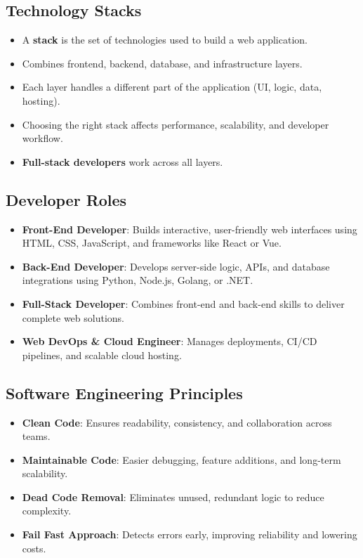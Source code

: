 \documentclass[hidelinks]{article}
\begin{document}
\subsection{Technology Stacks}
\begin{itemize}
  \item A \textbf{stack} is the set of technologies used to build a web application.
  \item Combines frontend, backend, database, and infrastructure layers.
  \item Each layer handles a different part of the application (UI, logic, data, hosting).
  \item Choosing the right stack affects performance, scalability, and developer workflow.
  \item \textbf{Full-stack developers} work across all layers.
\end{itemize}

\subsection{Developer Roles}
\begin{itemize}
  \item \textbf{Front-End Developer}: Builds interactive, user-friendly web interfaces using HTML, CSS, JavaScript, and frameworks like React or Vue.
  \item \textbf{Back-End Developer}: Develops server-side logic, APIs, and database integrations using Python, Node.js, Golang, or .NET.
  \item \textbf{Full-Stack Developer}: Combines front-end and back-end skills to deliver complete web solutions.
  \item \textbf{Web DevOps \& Cloud Engineer}: Manages deployments, CI/CD pipelines, and scalable cloud hosting.
\end{itemize}

\subsection{Software Engineering Principles}
\begin{itemize}
  \item \textbf{Clean Code}: Ensures readability, consistency, and collaboration across teams.
  \item \textbf{Maintainable Code}: Easier debugging, feature additions, and long-term scalability.
  \item \textbf{Dead Code Removal}: Eliminates unused, redundant logic to reduce complexity.
  \item \textbf{Fail Fast Approach}: Detects errors early, improving reliability and lowering costs.
\end{itemize}
\end{document}
